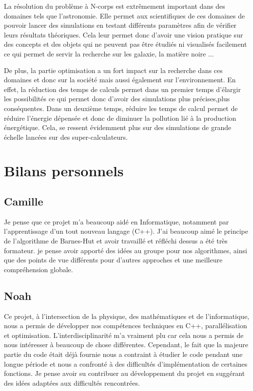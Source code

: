 La résolution du problème à N-corps est extrêmement important dans des domaines tels que l'astronomie. Elle permet aux scientifiques de ces domaines de pouvoir lancer des simulations en testant différents paramètres afin de vérifier leurs résultats théoriques.
Cela leur permet donc d'avoir une vision pratique sur des concepts et des objets qui ne peuvent pas être étudiés ni visualisés facilement ce qui permet de servir la recherche sur les galaxie, la matière noire ...


De plus, la partie optimisation a un fort impact sur la recherche dans ces domaines et donc sur la société mais aussi également sur l'environnement. En effet, la réduction des temps de calculs permet dans un premier temps d'élargir les possibilités ce qui permet donc d'avoir des simulations plus précises,plus conséquentes. Dans un deuxième temps, réduire les temps de calcul permet de réduire l'énergie dépensée et donc de diminuer la pollution lié à la production énergétique. Cela, se ressent évidemment plus sur des simulations de grande échelle lancées sur des super-calculateurs.

\section{Bilans personnels}

\subsection{Camille}

Je pense que ce projet m’a beaucoup aidé en Informatique,
notamment par l'apprentissage d’un tout nouveau langage (C++).
J’ai beaucoup aimé le principe de l’algorithme de Barnes-Hut et
avoir travaillé et réfléchi dessus a été très formateur. je pense
avoir apporté des idées au groupe pour nos algorithmes, ainsi que
des points de vue différents pour d’autres approches et une
meilleure compréhension globale.

\subsection{Noah}


Ce projet, à l'intersection de la physique, des mathématiques et de l'informatique, nous a permis de développer nos compétences techniques en C++, parallélisation et optimisation. L'interdisciplinarité m'a vraiment plu car cela nous a permis de nous intéresser à beaucoup de chose différentes. Cependant, le fait que la majeure partie du code était déjà fournie nous a contraint à étudier le code pendant une longue période et nous a confronté à des difficultés d'implémentation de certaines fonctions. Je pense avoir su contribuer au développement du projet en suggérant des idées adaptées aux difficultés rencontrées.

